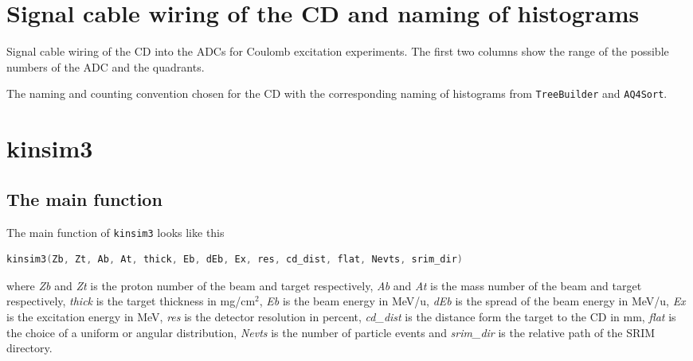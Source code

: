 \documentclass[twoside,english]{uiofysmaster/uiofysmaster}
\begin{document}
\begin{appendices}

\chapter{Signal cable wiring of the CD and naming of histograms}

\begin{table}[ht] 
	\centering 
	\caption{Signal cable wiring of the CD into the ADCs for Coulomb excitation experiments.
	The first two columns show the range of the possible numbers of the ADC and the quadrants.}
	
	\label{tab:ADC}
\end{table}


\begin{table}[ht] 
	\centering 
	\caption{The naming and counting convention chosen for the CD with the corresponding naming of histograms from \texttt{TreeBuilder} and \texttt{AQ4Sort}.}
	
	\label{tab:TBvsAQ4}
\end{table}




\chapter{kinsim3}\label{ch:cd_sim}

\section{The main function}
The main function of \texttt{kinsim3} looks like this
\begin{lstlisting}[language=c++]
kinsim3(Zb, Zt, Ab, At, thick, Eb, dEb, Ex, res, cd_dist, flat, Nevts, srim_dir)
\end{lstlisting}
where \textit{Zb} and \textit{Zt} is the proton number of the beam and target respectively, \textit{Ab} and \textit{At} is the mass number of the beam and target respectively, \textit{thick} is the target thickness in mg/cm$^2$, \textit{Eb} is the beam energy in MeV/u, \textit{dEb} is the spread of the beam energy in MeV/u, \textit{Ex} is the excitation energy in MeV, \textit{res} is the detector resolution in percent, \textit{cd\_dist} is the distance form the target to the CD in mm, \textit{flat} is the choice of a uniform or angular distribution, \textit{Nevts} is the number of particle events and \textit{srim\_dir} is the relative path of the SRIM directory.


\end{appendices}
\end{document}
